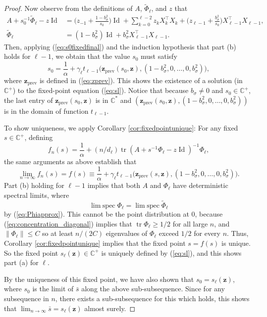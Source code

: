 \documentclass{article}
\theoremstyle{definition}
\newcommand{\C}{\mathbb{C}}
\newcommand{\Id}{\operatorname{Id}}
\newcommand{\prev}{{\text{prev}}}
\newcommand{\tr}{\operatorname{tr}}
\newcommand{\z}{\mathbf{z}}
\newcommand{\1}{\mathbf{1}}
\newcommand{\limspec}{\operatorname{lim\;spec}}
\begin{document}
\begin{proof}
Now observe from the definitions of $A$, $\tilde{\Phi}_\ell$, and $z$ that 
\begin{align*}
A+s_0^{-1}\tilde{\Phi}_\ell-z\Id
&=\Big(z_{-1}+\frac{1-b_\sigma^2}{s_0}\Big)\Id
+\sum_{k=0}^{\ell-2} z_kX_k^\top X_k
+\Big(z_{\ell-1}+\frac{b_\sigma^2}{s_0}\Big)X_{\ell-1}^\top X_{\ell-1},\\
\tilde{\Phi}_\ell&=(1-b_\sigma^2)\Id+b_\sigma^2 X_{\ell-1}^\top X_{\ell-1}.
\end{align*}
Then, applying (\ref{eq:s0fixedfinal}) and the induction hypothesis
that part (b) holds for $\ell-1$, we obtain that the value $s_0$ must satisfy
\[s_0=\frac{1}{\alpha}+\gamma_\ell t_{\ell-1}
\Big(\z_\prev(s_0,\z),(1-b_\sigma^2,0,\ldots,0,b_\sigma^2)\Big),\]
where $\z_\prev$ is defined in (\ref{eq:zprev}). This shows the existence of a
solution (in $\C^+$) to the fixed-point equation (\ref{eq:sl}). Notice that
because $b_\sigma\neq 0$ and $s_0\in\C^+$, the last entry of $\z_\prev(s_0,\z)$
is in $\C^*$ and $(\z_\prev(s_0,\z),(1-b_\sigma^2,0,\ldots,0,b_\sigma^2))$ is in the domain of function $t_{\ell-1}$.

To show uniqueness, we apply Corollary \ref{cor:fixedpointunique}:
For any fixed $s \in \C^+$, defining
\[f_n(s)=\frac{1}{\alpha}+(n/d_\ell)\tr (A+s^{-1}\Phi_\ell-z\Id)^{-1}\Phi_\ell,\]
the same arguments as above establish that
\[\lim_{n \to \infty} f_n(s)=f(s) \equiv 
\frac{1}{\alpha}+\gamma_\ell t_{\ell-1}
\Big(\z_\prev(s,\z),(1-b_\sigma^2,0,\ldots,0,b_\sigma^2)\Big).\]
Part (b) holding for $\ell-1$ implies that both $A$ and
$\Phi_\ell$ have deterministic spectral limits, where
\[\limspec \Phi_\ell=\limspec \tilde{\Phi}_\ell\]
by (\ref{eq:Phiapprox}). This cannot be the point distribution at 0,
because (\ref{eq:concentration_diagonal}) implies that $\tr \Phi_\ell \geq 1/2$ for
all large $n$, and $\|\Phi_\ell\| \leq C$ so at least $n/(2C)$ eigenvalues of
$\Phi_\ell$ exceed $1/2$ for every $n$.
Thus, Corollary \ref{cor:fixedpointunique} implies that the
fixed point $s=f(s)$ is unique. So the fixed point $s_\ell(\z) \in \C^+$ is
uniquely defined by (\ref{eq:sl}), and this shows part (a) for $\ell$.

By the uniqueness of this fixed point, we have also shown that $s_0=s_\ell(\z)$,
where $s_0$ is the limit of $\bar{s}$ along the above sub-subsequence. Since for
any subsequence in $n$, there exists a sub-subsequence for this which holds,
this shows that $\lim_{n \to \infty} \bar{s}=s_\ell(\z)$ almost surely.


\end{proof}
\end{document}
